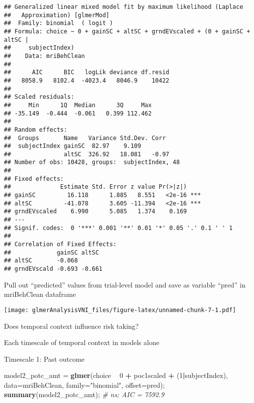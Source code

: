 \documentclass[]{article}
\newenvironment{Shaded}{\begin{snugshade}}{\end{snugshade}}
\newcommand{\CommentTok}[1]{\textcolor[rgb]{0.56,0.35,0.01}{\textit{#1}}}
\newcommand{\DataTypeTok}[1]{\textcolor[rgb]{0.13,0.29,0.53}{#1}}
\newcommand{\DecValTok}[1]{\textcolor[rgb]{0.00,0.00,0.81}{#1}}
\newcommand{\KeywordTok}[1]{\textcolor[rgb]{0.13,0.29,0.53}{\textbf{#1}}}
\newcommand{\NormalTok}[1]{#1}
\newcommand{\OperatorTok}[1]{\textcolor[rgb]{0.81,0.36,0.00}{\textbf{#1}}}
\newcommand{\StringTok}[1]{\textcolor[rgb]{0.31,0.60,0.02}{#1}}
\begin{document}
\begin{verbatim}
## Generalized linear mixed model fit by maximum likelihood (Laplace
##   Approximation) [glmerMod]
##  Family: binomial  ( logit )
## Formula: choice ~ 0 + gainSC + altSC + grndEVscaled + (0 + gainSC + altSC |  
##     subjectIndex)
##    Data: mriBehClean
## 
##      AIC      BIC   logLik deviance df.resid 
##   8058.9   8102.4  -4023.4   8046.9    10422 
## 
## Scaled residuals: 
##     Min      1Q  Median      3Q     Max 
## -35.149  -0.444  -0.061   0.399 112.462 
## 
## Random effects:
##  Groups       Name   Variance Std.Dev. Corr 
##  subjectIndex gainSC  82.97    9.109        
##               altSC  326.92   18.081   -0.97
## Number of obs: 10428, groups:  subjectIndex, 48
## 
## Fixed effects:
##              Estimate Std. Error z value Pr(>|z|)    
## gainSC         16.118      1.885   8.551   <2e-16 ***
## altSC         -41.078      3.605 -11.394   <2e-16 ***
## grndEVscaled    6.990      5.085   1.374    0.169    
## ---
## Signif. codes:  0 '***' 0.001 '**' 0.01 '*' 0.05 '.' 0.1 ' ' 1
## 
## Correlation of Fixed Effects:
##             gainSC altSC 
## altSC       -0.068       
## grndEVscald -0.693 -0.661
\end{verbatim}

Pull out ``predicted'' values from trial-level model and save as
variable ``pred'' in mriBehClean dataframe

\begin{Shaded}
\end{Shaded}

\texttt{[image: glmerAnalysisVNI\_files/figure-latex/unnamed-chunk-7-1.pdf]}

Does temporal context influence risk taking?

Each timescale of temporal context in models alone

Timescale 1: Past outcome

\begin{Shaded}
\begin{Highlighting}[]
\NormalTok{model2_potc_amt =}\StringTok{ }\KeywordTok{glmer}\NormalTok{(choice }\OperatorTok{~}\StringTok{ }\DecValTok{0} \OperatorTok{+}\StringTok{ }\NormalTok{poc1scaled }\OperatorTok{+}\StringTok{ }\NormalTok{(}\DecValTok{1}\OperatorTok{|}\NormalTok{subjectIndex), }\DataTypeTok{data=}\NormalTok{mriBehClean, }\DataTypeTok{family=}\StringTok{"binomial"}\NormalTok{, }\DataTypeTok{offset=}\NormalTok{pred);}
\KeywordTok{summary}\NormalTok{(model2_potc_amt);  }\CommentTok{# ns; AIC = 7592.9 }
\end{Highlighting}
\end{Shaded}
\end{document}
